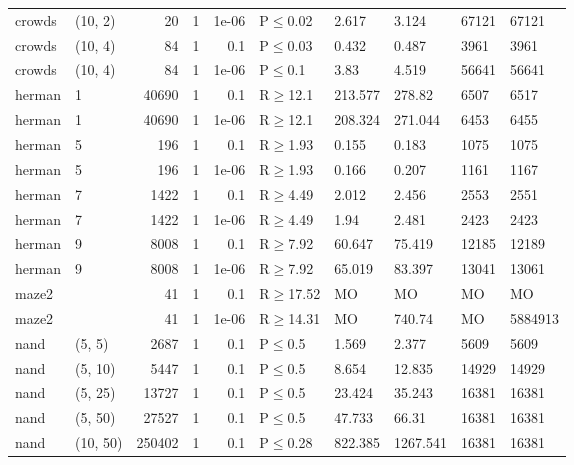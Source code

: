 \begin{longtable}{llrrrlllll}
 crowds        & (10, 2)   &     	20 & 1 & 1e-06 & P$\leq$0.02  & 2.617   & 3.124    & 67121  & 67121   \\
 crowds        & (10, 4)   &     	84 & 1 & 0.1   & P$\leq$0.03  & 0.432   & 0.487    & 3961   & 3961    \\
 crowds        & (10, 4)   &     	84 & 1 & 1e-06 & P$\leq$0.1   & 3.83    & 4.519    & 56641  & 56641   \\
 herman        & 1         &  	40690 & 1 & 0.1   & R$\geq$12.1  & 213.577 & 278.82   & 6507   & 6517    \\
 herman        & 1         &  	40690 & 1 & 1e-06 & R$\geq$12.1  & 208.324 & 271.044  & 6453   & 6455    \\
 herman        & 5         &    	196 & 1 & 0.1   & R$\geq$1.93  & 0.155   & 0.183    & 1075   & 1075    \\
 herman        & 5         &    	196 & 1 & 1e-06 & R$\geq$1.93  & 0.166   & 0.207    & 1161   & 1167    \\
 herman        & 7         &   	1422 & 1 & 0.1   & R$\geq$4.49  & 2.012   & 2.456    & 2553   & 2551    \\
 herman        & 7         &   	1422 & 1 & 1e-06 & R$\geq$4.49  & 1.94    & 2.481    & 2423   & 2423    \\
 herman        & 9         &   	8008 & 1 & 0.1   & R$\geq$7.92  & 60.647  & 75.419   & 12185  & 12189   \\
 herman        & 9         &   	8008 & 1 & 1e-06 & R$\geq$7.92  & 65.019  & 83.397   & 13041  & 13061   \\
 maze2         &           &     	41 & 1 & 0.1   & R$\geq$17.52 & MO      & MO       & MO     & MO      \\
 maze2         &           &     	41 & 1 & 1e-06 & R$\geq$14.31 & MO      & 740.74   & MO     & 5884913 \\
 nand          & (5, 5)    &   	2687 & 1 & 0.1   & P$\leq$0.5   & 1.569   & 2.377    & 5609   & 5609    \\
 nand          & (5, 10)   &   	5447 & 1 & 0.1   & P$\leq$0.5   & 8.654   & 12.835   & 14929  & 14929   \\
 nand          & (5, 25)   &  	13727 & 1 & 0.1   & P$\leq$0.5   & 23.424  & 35.243   & 16381  & 16381   \\
 nand          & (5, 50)   &  	27527 & 1 & 0.1   & P$\leq$0.5   & 47.733  & 66.31    & 16381  & 16381   \\
 nand          & (10, 50)  & 	250402 & 1 & 0.1   & P$\leq$0.28  & 822.385 & 1267.541 & 16381  & 16381   \\

\end{longtable}
